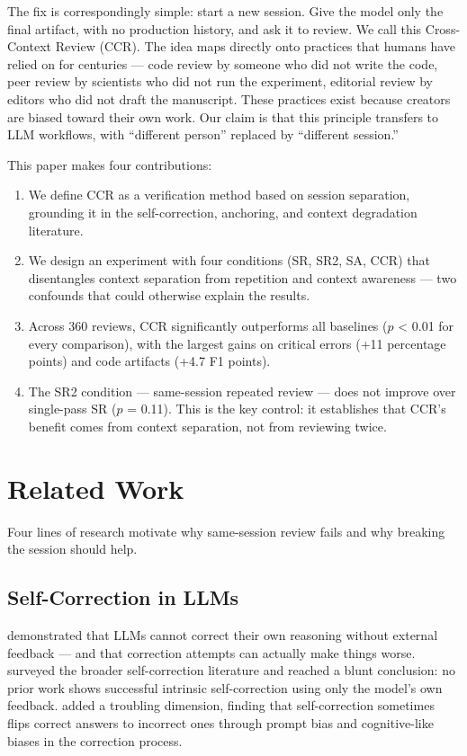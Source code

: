 \documentclass[11pt]{article}
\begin{document}
The fix is correspondingly simple: start a new session. Give the model only the final artifact, with no production history, and ask it to review. We call this Cross-Context Review (CCR). The idea maps directly onto practices that humans have relied on for centuries --- code review by someone who did not write the code, peer review by scientists who did not run the experiment, editorial review by editors who did not draft the manuscript. These practices exist because creators are biased toward their own work. Our claim is that this principle transfers to LLM workflows, with ``different person'' replaced by ``different session.''

This paper makes four contributions:

\begin{enumerate}
\item We define CCR as a verification method based on session separation, grounding it in the self-correction, anchoring, and context degradation literature.
\item We design an experiment with four conditions (SR, SR2, SA, CCR) that disentangles context separation from repetition and context awareness --- two confounds that could otherwise explain the results.
\item Across 360 reviews, CCR significantly outperforms all baselines ($p$ < 0.01 for every comparison), with the largest gains on critical errors (+11 percentage points) and code artifacts (+4.7 F1 points).
\item The SR2 condition --- same-session repeated review --- does not improve over single-pass SR ($p$ = 0.11). This is the key control: it establishes that CCR's benefit comes from context separation, not from reviewing twice.
\end{enumerate}

\section{Related Work}

Four lines of research motivate why same-session review fails and why breaking the session should help.

\subsection{Self-Correction in LLMs}

\citet{huang2024llms} demonstrated that LLMs cannot correct their own reasoning without external feedback --- and that correction attempts can actually make things worse. \citet{kamoi2024when} surveyed the broader self-correction literature and reached a blunt conclusion: no prior work shows successful intrinsic self-correction using only the model's own feedback. \citet{zhang2025dark} added a troubling dimension, finding that self-correction sometimes flips correct answers to incorrect ones through prompt bias and cognitive-like biases in the correction process.
\end{document}
